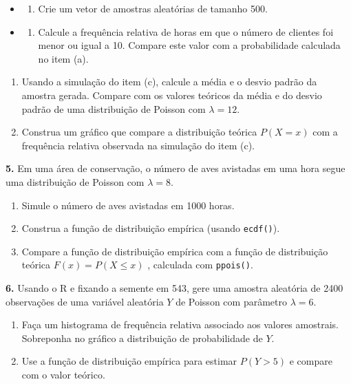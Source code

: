 \documentclass[
]{book}
\providecommand{\tightlist}{%
  \setlength{\itemsep}{0pt}\setlength{\parskip}{0pt}}
\begin{document}
\begin{itemize}
\tightlist
\item
  \begin{enumerate}
  \def\labelenumi{(\roman{enumi})}
  \tightlist
  \item
    Crie um vetor de amostras aleatórias de tamanho 500.
  \end{enumerate}
\item
  \begin{enumerate}
  \def\labelenumi{(\roman{enumi})}
  \setcounter{enumi}{1}
  \tightlist
  \item
    Calcule a frequência relativa de horas em que o número de clientes foi menor ou igual a 10. Compare este valor com a probabilidade calculada no item (a).
  \end{enumerate}
\end{itemize}

\begin{enumerate}
\def\labelenumi{(\alph{enumi})}
\setcounter{enumi}{3}
\item
  Usando a simulação do item (c), calcule a média e o desvio padrão da amostra gerada. Compare com os valores teóricos da média e do desvio padrão de uma distribuição de Poisson com \(\lambda = 12\).
\item
  Construa um gráfico que compare a distribuição teórica \(P(X = x)\) com a frequência relativa observada na simulação do item (c).
\end{enumerate}

\textbf{5.} Em uma área de conservação, o número de aves avistadas em uma hora segue uma distribuição de Poisson com \(\lambda = 8\).

\begin{enumerate}
\def\labelenumi{(\alph{enumi})}
\item
  Simule o número de aves avistadas em 1000 horas.
\item
  Construa a função de distribuição empírica (usando \texttt{ecdf()}).
\item
  Compare a função de distribuição empírica com a função de distribuição teórica \(F(x) = P(X \leq x)\) , calculada com \texttt{ppois()}.
\end{enumerate}

\textbf{6.} Usando o R e fixando a semente em 543, gere uma amostra aleatória
de 2400 observações de uma variável aleatória \(Y\) de Poisson com
parâmetro \(\lambda = 6\).

\begin{enumerate}
\def\labelenumi{(\alph{enumi})}
\item
  Faça um histograma de frequência relativa associado aos valores
  amostrais. Sobreponha no gráfico a distribuição de probabilidade de \(Y\).
\item
  Use a função de distribuição empírica para estimar \(P(Y > 5)\) e
  compare com o valor teórico.
\end{enumerate}
\end{document}

